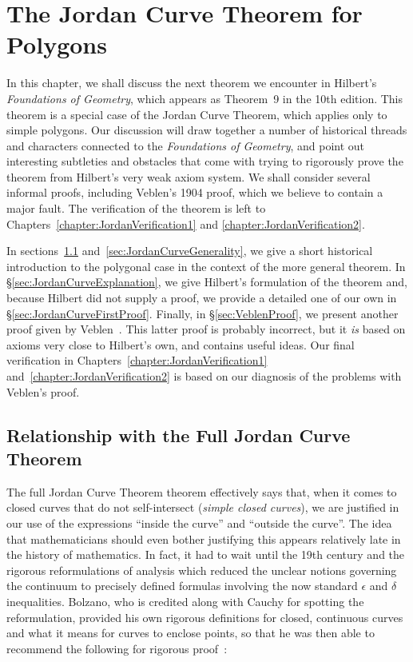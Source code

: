 \chapter{The Jordan Curve Theorem for Polygons}\label{chapter:JordanInformal}
In this chapter, we shall discuss the next theorem we encounter in Hilbert's \emph{Foundations of Geometry}, which appears as Theorem~9 in the 10th edition. This theorem is a special case of the Jordan Curve Theorem, which applies only to simple polygons. Our discussion will draw together a number of historical threads and characters connected to the \emph{Foundations of Geometry}, and point out interesting subtleties and obstacles that come with trying to rigorously prove the theorem from Hilbert's very weak axiom system. We shall consider several informal proofs, including Veblen's 1904 proof, which we believe to contain a major fault. The verification of the theorem is left to Chapters~\ref{chapter:JordanVerification1} and \ref{chapter:JordanVerification2}.

In sections~\ref{sec:JordanCurveHistory} and~\ref{sec:JordanCurveGenerality}, we give a short historical introduction to the polygonal case in the context of the more general theorem. In \S\ref{sec:JordanCurveExplanation}, we give Hilbert's formulation of the theorem and, because Hilbert did not supply a proof, we provide a detailed one of our own in \S\ref{sec:JordanCurveFirstProof}. Finally, in \S\ref{sec:VeblenProof}, we present another proof given by Veblen~\cite{Veblenphd}. This latter proof is probably incorrect, but it \emph{is} based on axioms very close to Hilbert's own, and contains useful ideas. Our final verification in Chapters~\ref{chapter:JordanVerification1} and~\ref{chapter:JordanVerification2} is based on our diagnosis of the problems with Veblen's proof.

\section{Relationship with the Full Jordan Curve Theorem}\label{sec:JordanCurveHistory}
The full Jordan Curve Theorem theorem effectively says that, when it comes to closed curves that do not self-intersect (\emph{simple closed curves}), we are justified in our use of the expressions ``inside the curve'' and ``outside the curve''. The idea that mathematicians should even bother justifying this appears relatively late in the history of mathematics. In fact, it had to wait until the 19th century and the rigorous reformulations of analysis which reduced the unclear notions governing the continuum to precisely defined formulas involving the now standard $\epsilon$ and $\delta$ inequalities. Bolzano, who is credited along with Cauchy for spotting the reformulation, provided his own rigorous definitions for closed, continuous curves and what it means for curves to enclose points, so that he was then able to recommend the following for rigorous proof~\cite{BolzanoJordan}:


